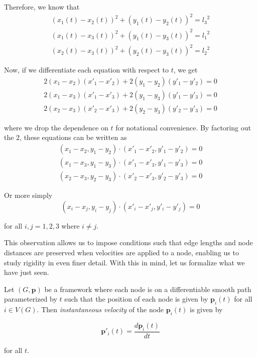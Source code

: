 \begin{flushleft}
Therefore, we know that 
\[
\begin{split}
(x_1(t) - x_2(t))^2 + (y_1(t) - y_2(t))^2 = {l_3}^2 \\
(x_1(t) - x_3(t))^2 + (y_1(t) - y_3(t))^2 = {l_1}^2 \\
(x_2(t) - x_3(t))^2 + (y_2(t) - y_3(t))^2 = {l_2}^2
\end{split}
\]

Now, if we differentiate each equation with respect to $t$, we get 
\[
\begin{split}
2(x_1 - x_2)(x'_1 - x'_2) + 2(y_1 - y_2)(y'_1 - y'_2) = 0 \\
2(x_1 - x_3)(x'_1 - x'_3) + 2(y_1 - y_3)(y'_1 - y'_3) = 0 \\
2(x_2 - x_3)(x'_2 - x'_3) + 2(y_2 - y_3)(y'_2 - y'_3) = 0
\end{split}
\]

where we drop the dependence on $t$ for notational convenience. By factoring out the $2$, these equations can be written as
\[
\begin{split}
(x_1 - x_2, y_1 - y_2) \cdot (x'_1 - x'_2, y'_1 - y'_2) = 0 \\
(x_1 - x_3, y_1 - y_3) \cdot (x'_1 - x'_3, y'_1 - y'_3) = 0 \\
(x_2 - x_3, y_2 - y_3) \cdot (x'_2 - x'_3, y'_2 - y'_3) = 0
\end{split}
\]

Or more simply
\[
(x_i - x_j, y_i - y_j) \cdot (x'_i - x'_j, y'_i - y'_j) = 0
\]

for all $i,j = 1,2,3$ where $i \neq j$.
\end{flushleft}

\begin{flushleft}
This observation allows us to impose conditions such that edge lengths and node distances are preserved when velocities are applied to a node, enabling us to study rigidity in even finer detail. With this in mind, let us formalize what we have just seen.
\end{flushleft}

\begin{definition}
Let $(G,\mathbf{p})$ be a framework where each node is on a differentiable smooth path parameterized by $t$ such that the position of each node is given by $\mathbf{p}_i(t)$ for all $i \in  V(G)$. Then \textit{instantaneous velocity} of the node $\mathbf{p}_i(t)$ is given by

\[
\mathbf{p}'_i(t) = \frac{d\mathbf{p}_i(t)}{dt}
\]

\noindent
for all $t$.
\end{definition} 

